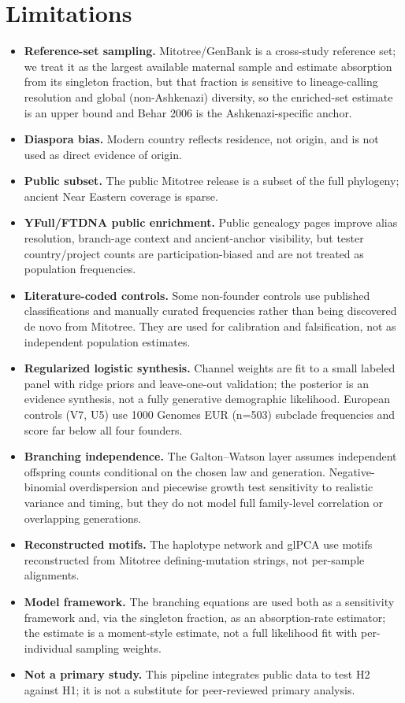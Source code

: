 \documentclass[11pt]{article}
\begin{document}
\section{Limitations}
\begin{itemize}
\item \textbf{Reference-set sampling.} Mitotree/GenBank is a cross-study reference set; we treat it as the largest available maternal sample and estimate absorption from its singleton fraction, but that fraction is sensitive to lineage-calling resolution and global (non-Ashkenazi) diversity, so the enriched-set estimate is an upper bound and Behar 2006 is the Ashkenazi-specific anchor.
\item \textbf{Diaspora bias.} Modern country reflects residence, not origin, and is not used as direct evidence of origin.
\item \textbf{Public subset.} The public Mitotree release is a subset of the full phylogeny; ancient Near Eastern coverage is sparse.
\item \textbf{YFull/FTDNA public enrichment.} Public genealogy pages improve alias resolution, branch-age context and ancient-anchor visibility, but tester country/project counts are participation-biased and are not treated as population frequencies.
\item \textbf{Literature-coded controls.} Some non-founder controls use published classifications and manually curated frequencies rather than being discovered de novo from Mitotree. They are used for calibration and falsification, not as independent population estimates.
\item \textbf{Regularized logistic synthesis.} Channel weights are fit to a small labeled panel with ridge priors and leave-one-out validation; the posterior is an evidence synthesis, not a fully generative demographic likelihood. European controls (V7, U5) use 1000 Genomes EUR (n=503) subclade frequencies and score far below all four founders.
\item \textbf{Branching independence.} The Galton--Watson layer assumes independent offspring counts conditional on the chosen law and generation. Negative-binomial overdispersion and piecewise growth test sensitivity to realistic variance and timing, but they do not model full family-level correlation or overlapping generations.
\item \textbf{Reconstructed motifs.} The haplotype network and glPCA use motifs reconstructed from Mitotree defining-mutation strings, not per-sample alignments.
\item \textbf{Model framework.} The branching equations are used both as a sensitivity framework and, via the singleton fraction, as an absorption-rate estimator; the estimate is a moment-style estimate, not a full likelihood fit with per-individual sampling weights.
\item \textbf{Not a primary study.} This pipeline integrates public data to test H2 against H1; it is not a substitute for peer-reviewed primary analysis.
\end{itemize}
\appendix
\end{document}
